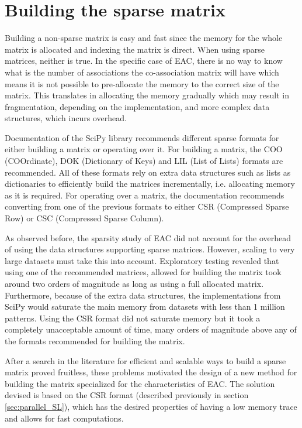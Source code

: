 \section{Building the sparse matrix}
\label{sec:sparse coassoc}

Building a non-sparse matrix is easy and fast since the memory for the whole matrix is allocated and indexing the matrix is direct.
When using sparse matrices, neither is true.
In the specific case of EAC, there is no way to know what is the number of associations the co-association matrix will have which means it is not possible to pre-allocate the memory to the correct size of the matrix.
This translates in allocating the memory gradually which may result in fragmentation, depending on the implementation, and more complex data structures, which incurs overhead.


Documentation of the SciPy library recommends different sparse formats for either building a matrix or operating over it.
For building a matrix, the COO (COOrdinate), DOK (Dictionary of Keys) and LIL (List of Lists) formats are recommended.
All of these formats rely on extra data structures such as lists as dictionaries to efficiently build the matrices incrementally, i.e. allocating memory as it is required.
For operating over a matrix, the documentation recommends converting from one of the previous formats to either CSR (Compressed Sparse Row) or CSC (Compressed Sparse Column).

As observed before, the sparsity study of EAC \cite{Lourenco2010} did not account for the overhead of using the data structures supporting sparse matrices.
However, scaling to very large datasets must take this into account.
Exploratory testing revealed that using one of the recommended matrices, allowed for building the matrix took around two orders of magnitude as long as using a full allocated matrix.
Furthermore, because of the extra data structures, the implementations from SciPy would saturate the main memory from datasets with less than 1 million patterns.
Using the CSR format did not saturate memory but it took a completely unacceptable amount of time, many orders of magnitude above any of the formats recommended for building the matrix.

After a search in the literature for efficient and scalable ways to build a sparse matrix proved fruitless, these problems motivated the design of a new method for building the matrix specialized for the characteristics of EAC.
The solution devised is based on the CSR format (described previously in section \ref{sec:parallel_SL}), which has the desired properties of having a low memory trace and allows for fast computations.

